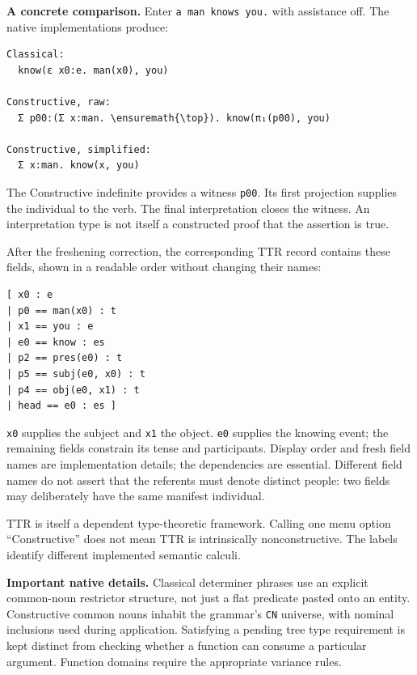 \documentclass[11pt,a4paper]{article}
\begin{document}
\textbf{A concrete comparison.} Enter \texttt{a\ man\ knows\ you.} with
assistance off. The native implementations produce:

\begin{Verbatim}[fontsize=\small,breaklines=true,breakanywhere=true,commandchars=\\\{\},frame=single,rulecolor=\color{DSmuted},framesep=5pt]
Classical:
  know(ε x0:e. man(x0), you)

Constructive, raw:
  Σ p00:(Σ x:man. \ensuremath{\top}). know(π₁(p00), you)

Constructive, simplified:
  Σ x:man. know(x, you)
\end{Verbatim}

The Constructive indefinite provides a witness \texttt{p00}. Its first
projection supplies the individual to the verb. The final interpretation
closes the witness. An interpretation type is not itself a constructed
proof that the assertion is true.

After the freshening correction, the corresponding TTR record contains
these fields, shown in a readable order without changing their names:

\begin{Verbatim}[fontsize=\small,breaklines=true,breakanywhere=true,commandchars=\\\{\},frame=single,rulecolor=\color{DSmuted},framesep=5pt]
[ x0 : e
| p0 == man(x0) : t
| x1 == you : e
| e0 == know : es
| p2 == pres(e0) : t
| p5 == subj(e0, x0) : t
| p4 == obj(e0, x1) : t
| head == e0 : es ]
\end{Verbatim}

\texttt{x0} supplies the subject and \texttt{x1} the object. \texttt{e0}
supplies the knowing event; the remaining fields constrain its tense and
participants. Display order and fresh field names are implementation
details; the dependencies are essential. Different field names do not
assert that the referents must denote distinct people: two fields may
deliberately have the same manifest individual.

TTR is itself a dependent type-theoretic framework. Calling one menu
option ``Constructive'' does not mean TTR is intrinsically
nonconstructive. The labels identify different implemented semantic
calculi.

\textbf{Important native details.} Classical determiner phrases use an
explicit common-noun restrictor structure, not just a flat predicate
pasted onto an entity. Constructive common nouns inhabit the grammar's
\texttt{CN} universe, with nominal inclusions used during application.
Satisfying a pending tree type requirement is kept distinct from
checking whether a function can consume a particular argument. Function
domains require the appropriate variance rules.
\end{document}

